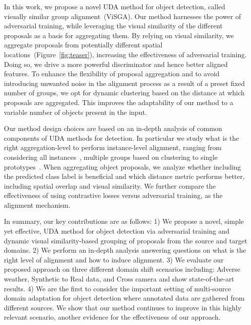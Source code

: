 \documentclass[10pt,twocolumn,letterpaper]{article}
\def\ourda{ViSGA\xspace}
\begin{document}
In this work, we propose a novel UDA method for object detection, called visually similar group alignment~(\ourda). Our method harnesses the power of adversarial training, while leveraging the visual similarity of the different proposals as a basis for aggregating them. By relying on visual similarity, we aggregate proposals from potentially different spatial locations~(Figure~\ref{fig:teaser}), increasing the effectiveness of adversarial training.
Doing so, we drive a more powerful discriminator and hence better aligned features. To enhance the flexibility of proposal aggregation and to avoid introducing unwanted noise in the alignment process as a result of a preset fixed number of groups, we opt for  dynamic clustering based on the distance at which proposals are aggregated. This
improves the adaptability of our method to a variable number of objects present in the input.  


Our method design choices are based on an in-depth analysis of common components of UDA methods for detection.
In particular we study what is the right aggregation-level to perform instance-level alignment, ranging from considering all instances~\cite{da_faster_rcnn}, multiple groups based on clustering to single prototypes~\cite{GPA}. 
When aggregating object proposals, we analyze whether including the predicted class label is beneficial and which distance metric performs better, including spatial overlap and visual similarity.
We further compare the effectiveness of using contrastive losses versus adversarial training, as the alignment mechanism. 


In summary, our key contributions are as follows:
1) We propose a novel, simple yet effective, UDA method for object detection via adversarial training and dynamic visual similarity-based grouping of proposals from the source and target domains.
2) We perform an in-depth analysis answering questions on what is the right level of alignment and how to induce alignment. 
3) We evaluate our proposed approach on three different domain shift scenarios including: Adverse weather, Synthetic to Real data, and Cross camera and show state-of-the-art results. 
4) We are the first to consider the important setting of multi-source domain adaptation for object detection where annotated data are gathered from different sources. We show that our method continues to improve  in this highly relevant scenario, another evidence for the effectiveness of our approach. 
%
 
\end{document}
